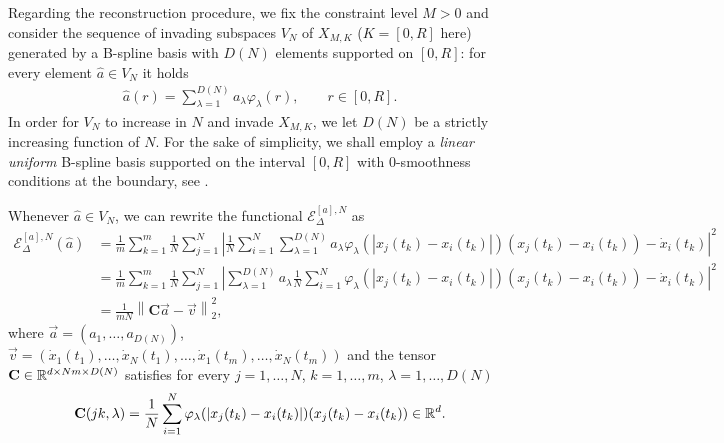 Regarding the reconstruction procedure, we fix the constraint level $M>0$ and consider the sequence of invading subspaces $V_N$ of $X_{M,K}$ ($K=[0, R]$ here) generated by a B-spline basis with $D(N) $ elements supported on $[0,R]$: for every element $\widehat{a} \in V_N$ it holds
\begin{align*}
	\widehat{a}(r) = \sum^{D(N)}_{\lambda = 1} a_{\lambda} \varphi_{\lambda}(r), \qquad r \in [0,R].
\end{align*}
In order for $V_N$ to increase in $N$ and invade $X_{M,K}$, we let $D(N)$ be a strictly increasing function of $N$. For the sake of simplicity, we shall employ a \textit{linear uniform} B-spline basis supported on the interval $[0,R]$ with $0$-smoothness conditions at the boundary, see \cite{deboor}.

Whenever $\widehat{a} \in V_N$, we can rewrite the functional $\mathcal{E}^{[a],N}_\Delta$ as
\begin{align*}
\mathcal{E}^{[a],N}_\Delta(\widehat{a}) & = \frac{1}{m} \sum^m_{k = 1} \frac{1}{N} \sum^N_{j = 1} \left| \frac{1}{N} \sum^N_{i = 1} \sum^{D(N)}_{\lambda = 1} a_{\lambda} \varphi_{\lambda}(|x_j(t_k) - x_i(t_k)|)(x_j(t_k) - x_i(t_k)) - \dot{x}_i(t_k)\right|^2 \\
& = \frac{1}{m} \sum^m_{k = 1} \frac{1}{N} \sum^N_{j = 1} \left| \sum^{D(N)}_{\lambda = 1} a_{\lambda} \frac{1}{N} \sum^N_{i = 1} \varphi_{\lambda}(|x_j(t_k) - x_i(t_k)|)(x_j(t_k) - x_i(t_k)) - \dot{x}_i(t_k)\right|^2 \\
& = \frac{1}{mN} \left\| \mathbf C  \vec{a} - \vec v \right\|^2_{2},
\end{align*}
where $\vec{a} = (a_1, \ldots, a_{D(N)})$, $\vec v = (\dot{x}_1(t_1), \ldots, \dot{x}_N(t_1), \ldots,\dot{x}_1(t_m), \ldots, \dot{x}_N(t_m))$ and the tensor $\mathbf C \in \mathbb{R}^{d\times Nm \times D(N)}$ satisfies for every $j = 1, \ldots,N$, $k = 1, \ldots,m$, $\lambda = 1, \ldots,D(N)$
\begin{align*}
\mathbf C(jk,\lambda) = \frac{1}{N} \sum^N_{i = 1} \varphi_{\lambda}(|x_j(t_k) - x_i(t_k)|)(x_j(t_k) - x_i(t_k)) \in \mathbb{R}^d.
\end{align*}

